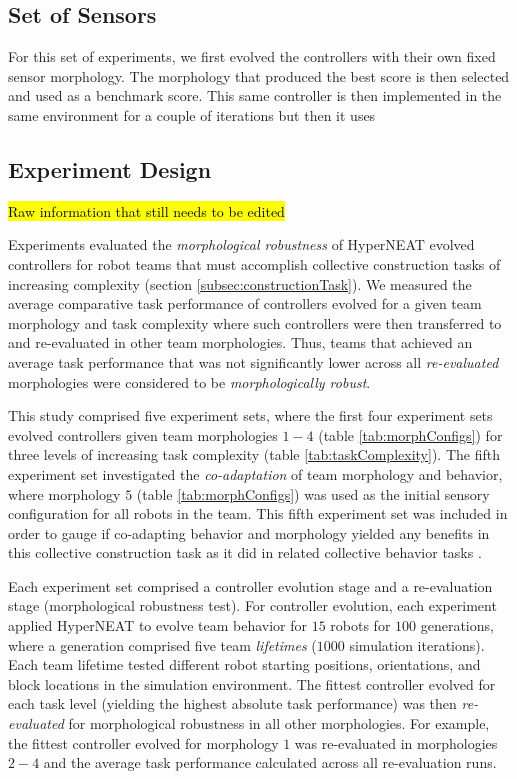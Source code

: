 \documentclass[conference]{IEEEtran}
\begin{document}
\subsection{Set of Sensors}
For this set of experiments, we first evolved the controllers with their own fixed sensor morphology. The morphology that produced the best score is then selected and used as a benchmark score. This same controller is then implemented in the same environment for a couple of iterations but then it uses

\subsection{Experiment Design}\label{subsec:expDesign}

\hl{Raw information that still needs to be edited}

Experiments evaluated the \textit{morphological robustness} of HyperNEAT evolved controllers for
robot teams that must accomplish collective construction tasks of increasing
complexity (section \ref{subsec:constructionTask}).
We measured the average comparative task performance of controllers evolved
for a given team morphology and task complexity where such controllers were
then transferred to
and re-evaluated in other team morphologies.
Thus, teams that achieved an average task performance that was not significantly lower
across all \textit{re-evaluated} morphologies were considered to be \textit{morphologically robust}.

This study comprised five experiment sets, where the first four experiment sets evolved
controllers given team morphologies $1-4$ (table \ref{tab:morphConfigs})
for three levels of increasing task complexity (table \ref{tab:taskComplexity}).
The fifth experiment set investigated the \textit{co-adaptation} of team morphology
and behavior, where morphology $5$ (table \ref{tab:morphConfigs}) was used
as the initial sensory configuration for all robots in the team.
This fifth experiment set was included in order to gauge if co-adapting behavior
and morphology yielded any benefits in this collective construction task as it did in related
collective behavior tasks \cite{HewlandNitschke2015}.

Each experiment set comprised a controller evolution stage and a re-evaluation stage
(morphological robustness test).
For controller evolution, each experiment applied HyperNEAT to evolve team behavior for
$15$ robots for $100$ generations,
where a generation comprised five team \textit{lifetimes} ($1000$ simulation iterations).
Each team lifetime tested different robot starting positions, orientations, and block locations
in the simulation environment.
The fittest controller evolved for each task level (yielding the highest absolute task performance)
was then \textit{re-evaluated} for morphological robustness in all other morphologies.
For example, the fittest controller evolved for morphology $1$ was re-evaluated in morphologies
$2-4$ and the average task performance calculated across all re-evaluation runs.
\end{document}
